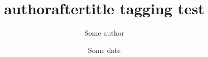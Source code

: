 \documentclass{article}
\title{authoraftertitle tagging test}
\author{Some author}
\date{Some date}
\begin{document}
\maketitle

\MyTitle

\MyAuthor

\MyDate
\end{document}
